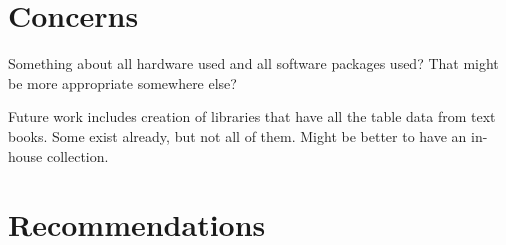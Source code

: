 \section{Concerns}
Something about all hardware used and all software packages used? 
That might be more appropriate somewhere else?

Future work includes creation of libraries that have all the table 
data from text books. Some exist already, but not all of them. Might 
be better to have an in-house collection.

\section{Recommendations}
